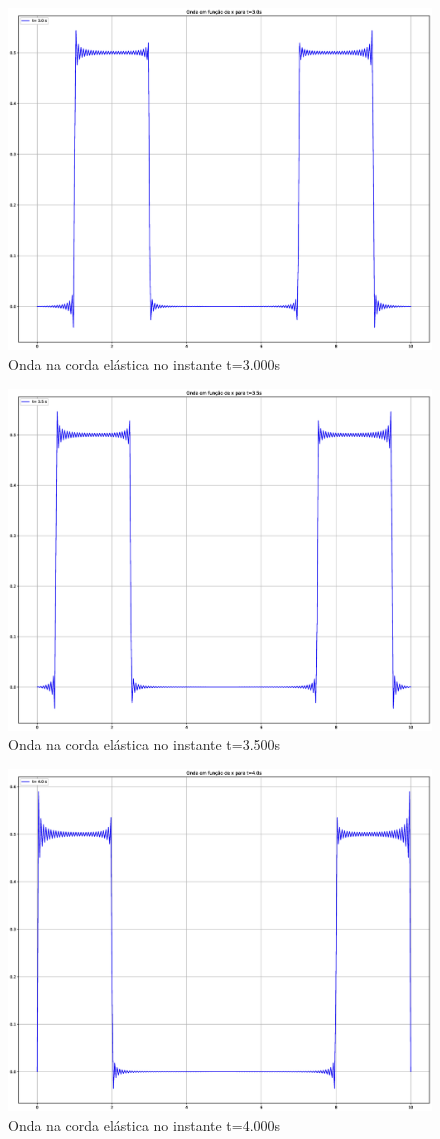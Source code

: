 \documentclass[12pt, a4paper, portuguese]{fphw}
\begin{document}
\begin{figure}[H]
	\centering
	\includegraphics[width=.8\linewidth]{"graficos/grafico_t=3.000s"}
	\caption{Onda na corda elástica no instante t=3.000s}
	\label{fig:grafico-t3}
\end{figure}

\begin{figure}[H]
	\centering
	\includegraphics[width=.8\linewidth]{"graficos/grafico_t=3.500s"}
	\caption{Onda na corda elástica no instante t=3.500s}
	\label{fig:grafico-t3.5}
\end{figure}

\begin{figure}[H]
	\centering
	\includegraphics[width=.8\linewidth]{"graficos/grafico_t=4.000s"}
	\caption{Onda na corda elástica no instante t=4.000s}
	\label{fig:grafico-t4}
\end{figure}
\end{document}
